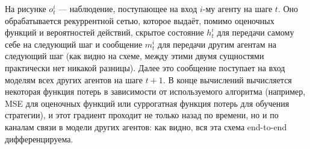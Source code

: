 На рисунке $o_t^i$ --- наблюдение, поступающее на вход $i$-му агенту на шаге $t$. Оно обрабатывается рекуррентной сетью, которое выдаёт, помимо оценочных функций и вероятностей действий, скрытое состояние $h^i_{t}$ для передачи самому себе на следующий шаг и сообщение $m^i_t$ для передачи другим агентам на следующий шаг (как видно на схеме, между этими двумя сущностями практически нет никакой разницы). Далее это сообщение поступает на вход моделям всех других агентов на шаге $t + 1$. В конце вычислений вычисляется некоторая функция потерь в зависимости от используемого алгоритма (например, MSE для оценочных функций или суррогатная функция потерь для обучения стратегии), и этот градиент проходит не только назад по времени, но и по каналам связи в модели других агентов: как видно, вся эта схема end-to-end дифференцируема.
